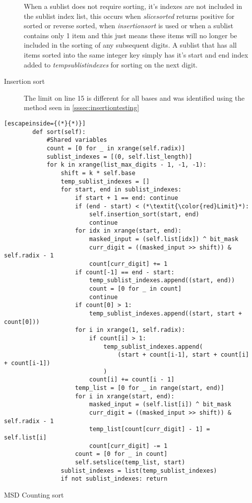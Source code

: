 \documentclass[12pt]{article}
\begin{document}
\begin{description}
	\par When a sublist does not require sorting, it's indexes are not included in the sublist index list, this occurs when \textit{slice\textunderscore sorted} returns positive for sorted or reverse sorted, when \textit{insertion\textunderscore sort} is used or when a sublist contains only 1 item and this just means these items will no longer be included in the sorting of any subsequent digits. A sublist that has all items sorted into the same integer key simply has it's start and end index added to \textit{temp\textunderscore sublist\textunderscore indexes} for sorting on the next digit.
	\item[Insertion sort] The limit on line 15 is different for all bases and was identified using the method seen in \ref{sssec:insertiontesting}
\end{description}
\begin{table}[H]
	\lstset{
		language=python,
    numbers=left,
    stepnumber=1,
    showstringspaces=false,
    tabsize=3,
    breaklines=true,
    breakatwhitespace=false,}
	\centering
	\begin{lstlisting}[escapeinside={(*}{*)}]
        def sort(self):
			#Shared variables
			count = [0 for _ in xrange(self.radix)]
			sublist_indexes = [(0, self.list_length)]
			for k in xrange(list_max_digits - 1, -1, -1):
				shift = k * self.base
				temp_sublist_indexes = []
				for start, end in sublist_indexes:
					if start + 1 == end: continue
					if (end - start) < (*\textit{\color{red}Limit}*):
						self.insertion_sort(start, end)
						continue
					for idx in xrange(start, end):
						masked_input = (self.list[idx]) ^ bit_mask
						curr_digit = ((masked_input >> shift)) & self.radix - 1
						count[curr_digit] += 1
					if count[-1] == end - start:
						temp_sublist_indexes.append((start, end))
						count = [0 for _ in count]
						continue
					if count[0] > 1:
						temp_sublist_indexes.append((start, start + count[0]))
					for i in xrange(1, self.radix):
						if count[i] > 1:
							temp_sublist_indexes.append(
								(start + count[i-1], start + count[i] + count[i-1])
							)
						count[i] += count[i - 1]
					temp_list = [0 for _ in range(start, end)]
					for i in xrange(start, end):
						masked_input = (self.list[i]) ^ bit_mask
						curr_digit = ((masked_input >> shift)) & self.radix - 1
						temp_list[count[curr_digit] - 1] = self.list[i]
						count[curr_digit] -= 1
					count = [0 for _ in count]
					self.setslice(temp_list, start)
				sublist_indexes = list(temp_sublist_indexes)
				if not sublist_indexes: return
\end{lstlisting}
\caption*{MSD Counting sort}
\end{table}
\end{document}
